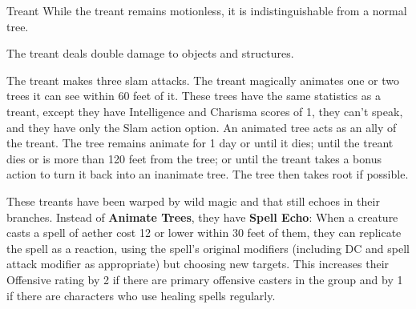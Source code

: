 \begin{DndMonster}{Treant}
	\DndMonsterBasics[armor-class={16 (natural armor)}, hit-points={150 (13d12 + 66)}, speed={30 ft.}]
	\DndMonsterDetails[saving-throws={}, skills={}, damage-immunities={}, damage-resistances={}, damage-vulnerabilities={fire}, condition-immunities={}, senses={passive Perception 13}, languages={Common, Metsae, Sylvan}, challenge={8:9}]
	 While the treant remains motionless, it is indistinguishable from a normal tree.
	
	 The treant deals double damage to objects and structures.
	
	 The treant makes three slam attacks.
	\DndMonsterAttack[
		name=Slam,
		distance=melee,
		type=weapon,
		mod=+10,
		reach=5,
		dmg=\DndDice{3d6 + 6},
		dmg-type=bludgeoning
	]
	\DndMonsterAttack[
		name=Rock,
		distance=ranged,
		type=weapon,
		mod=+10,
		range=60/180,
		dmg=\DndDice{4d10 + 6},
		dmg-type=bludgeoning
	]
	The treant magically animates one or two trees it can see within 60 feet of it. These trees have the same statistics as a treant, except they have Intelligence and Charisma scores of 1, they can't speak, and they have only the Slam action option. An animated tree acts as an ally of the treant. The tree remains animate for 1 day or until it dies; until the treant dies or is more than 120 feet from the tree; or until the treant takes a bonus action to turn it back into an inanimate tree. The tree then takes root if possible.

	 These treants have been warped by wild magic and that still echoes in their branches. Instead of \textbf{Animate Trees}, they have \textbf{Spell Echo}: When a creature casts a spell of aether cost 12 or lower within 30 feet of them, they can replicate the spell as a reaction, using the spell's original modifiers (including DC and spell attack modifier as appropriate) but choosing new targets. This increases their Offensive rating by 2 if there are primary offensive casters in the group and by 1 if there are characters who use healing spells regularly.
\end{DndMonster}